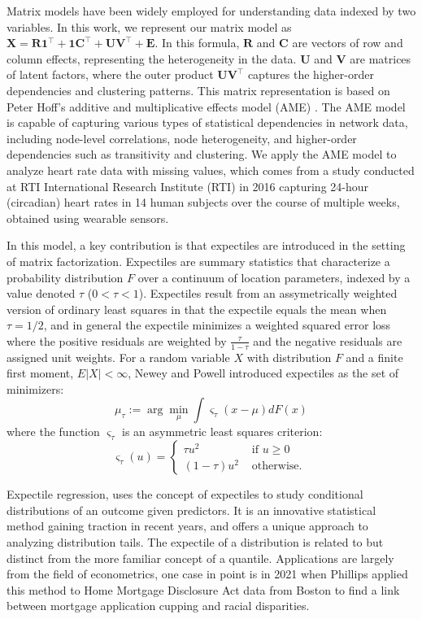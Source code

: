 \documentclass{article}
\begin{document}
Matrix models have been widely employed for understanding data indexed by two variables. In this work, we represent our matrix model as $\mathbf{X}=\mathbf{R} \mathbf{1}^{\top}+\mathbf{1} \mathbf{C}^{\top}+\mathbf{U} \mathbf{V}^{\top}+\mathbf{E}$. In this formula, $\mathbf{R}$  and $\mathbf{C}$ are vectors of row and column effects, representing the heterogeneity in the data. $\mathbf{U}$ and $\mathbf{V}$ are matrices of latent factors, where the outer product $\mathbf{U} \mathbf{V}^{\top}$ captures the higher-order dependencies and clustering patterns. This matrix representation is based on Peter Hoff's additive and multiplicative effects model (AME) \cite{hoff2021additive}. The AME model is capable of capturing various types of statistical dependencies in network data, including node-level correlations, node heterogeneity, and higher-order dependencies such as transitivity and clustering. We apply the AME model to analyze heart rate data with missing values, which comes from a study conducted at RTI International Research Institute
(RTI) in 2016\cite{furberg_2016_53894} capturing 24-hour (circadian) heart rates in 14 human subjects over the course of multiple weeks, obtained using wearable sensors.

In this model, a key contribution is that expectiles are introduced in the setting of matrix factorization. Expectiles are summary statistics that characterize a probability distribution $F$ over a continuum of location parameters, indexed by a value denoted $\tau$ ($0 < \tau < 1$).  Expectiles result from an assymetrically weighted version of ordinary least squares in that the expectile equals the mean when $\tau=1/2$, and in general the expectile minimizes a weighted squared error loss where the positive residuals are weighted by \(\frac{\tau}{1-\tau}\) and the negative residuals are assigned unit weights. For a random variable $X$ with distribution $F$ and a finite first moment, $E|X|<\infty$, Newey and Powell\cite{newey1987asymmetric} introduced expectiles as the set of minimizers:
$$
\mu_\tau:=\arg \min _\mu \int \varsigma_\tau(x-\mu) d F(x)
$$
where the function $\varsigma_\tau$ is an asymmetric least squares criterion:
$$
\varsigma_\tau(u)= \begin{cases}\tau u^2 & \text { if } u \geq 0 \\ (1-\tau) u^2 & \text { otherwise. }\end{cases}
$$


Expectile regression, uses the concept of expectiles to study conditional distributions of an outcome given predictors.  It is an innovative statistical method gaining traction in recent years, and offers a unique approach to analyzing distribution tails. The expectile of a distribution is related to but distinct from the more familiar concept of a quantile. Applications are largely from the field of econometrics, one case in point is in 2021 when Phillips\cite{philipps2021expectile} applied this method to Home Mortgage Disclosure Act data from Boston to find a link between mortgage application cupping and racial disparities. 
\end{document}
